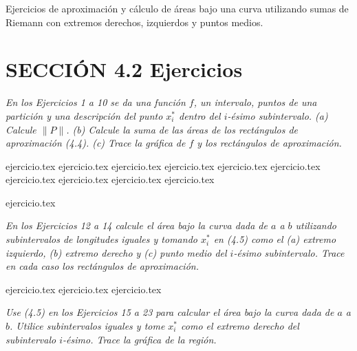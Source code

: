 
Ejercicios de aproximación y cálculo de áreas bajo una curva utilizando sumas de Riemann con extremos derechos, izquierdos y puntos medios.

\section*{SECCIÓN 4.2 \quad Ejercicios}

\noindent \textit{En los Ejercicios 1 a 10 se da una función $f$, un intervalo, puntos de una partición y una descripción del punto $x_i^*$ dentro del $i$-ésimo subintervalo. (a) Calcule $\|P\|$. (b) Calcule la suma de las áreas de los rectángulos de aproximación (4.4). (c) Trace la gráfica de $f$ y los rectángulos de aproximación.}

\begin{enumerate}
    {ejercicio.tex}
    {ejercicio.tex}
    {ejercicio.tex}
    {ejercicio.tex}
    {ejercicio.tex}
    {ejercicio.tex}
    {ejercicio.tex}
    {ejercicio.tex}
    {ejercicio.tex}
    {ejercicio.tex}
\end{enumerate}

\begin{enumerate}
    \setcounter{enumi}{10}
    {ejercicio.tex}
\end{enumerate}

\vspace{1em}
\noindent \textit{En los Ejercicios 12 a 14 calcule el área bajo la curva dada de $a$ a $b$ utilizando subintervalos de longitudes iguales y tomando $x_i^*$ en (4.5) como el (a) extremo izquierdo, (b) extremo derecho y (c) punto medio del $i$-ésimo subintervalo. Trace en cada caso los rectángulos de aproximación.}

\begin{enumerate}
    \setcounter{enumi}{11}
    {ejercicio.tex}
    {ejercicio.tex}
    {ejercicio.tex}
\end{enumerate}

\vspace{1em}
\noindent \textit{Use (4.5) en los Ejercicios 15 a 23 para calcular el área bajo la curva dada de $a$ a $b$. Utilice subintervalos iguales y tome $x_i^*$ como el extremo derecho del subintervalo $i$-ésimo. Trace la gráfica de la región.}

